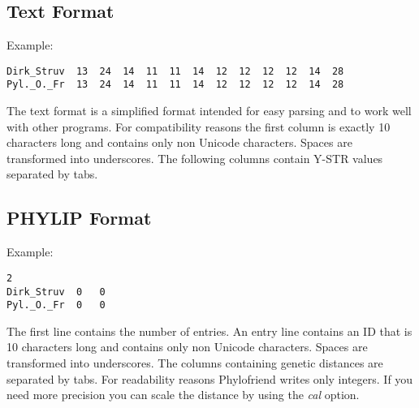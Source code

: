 \subsection{Text Format}

Example:

\begin{verbatim}
Dirk_Struv	13	24	14	11	11	14	12	12	12	12	14	28
Pyl._O._Fr	13	24	14	11	11	14	12	12	12	12	14	28
\end{verbatim}

The text format is a simplified format intended for easy
parsing and to work well with other programs. For compatibility
reasons the first column is exactly 10 characters long and
contains only non Unicode characters. Spaces are transformed into
underscores. The following columns contain Y-STR values
separated by tabs.


\subsection{PHYLIP Format}

Example:

\begin{verbatim}
2
Dirk_Struv	0	0
Pyl._O._Fr	0	0
\end{verbatim}

The first line contains the number of entries. An entry
line contains an ID that is 10 characters long and contains
only non Unicode characters. Spaces are transformed into
underscores. The columns containing genetic distances
are separated by tabs. For readability reasons
Phylofriend writes only integers. If you need more precision
you can scale the distance by using the \emph{cal} option.







